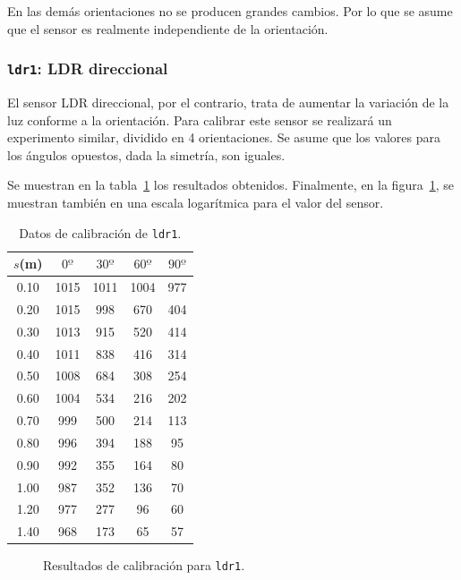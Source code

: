 \documentclass[10pt,a4paper,hidelinks,twocolumn,nobalancelastpage]{article}
\begin{document}
En las demás orientaciones no se producen grandes cambios. Por lo que se asume 
que el sensor es realmente independiente de la orientación.
\subsubsection{\texttt{ldr1}: LDR direccional}
El sensor LDR direccional, por el contrario, trata de aumentar la variación de 
la luz conforme a la orientación. Para calibrar este sensor se realizará un 
experimento similar, dividido en 4 orientaciones. Se asume que los valores para 
los ángulos opuestos, dada la simetría, son iguales.

Se muestran en la tabla~\ref{tab:ldr1} los resultados obtenidos. Finalmente, en 
la figura~\ref{fig:ldr1}, se muestran también en una escala logarítmica para el 
valor del sensor.

\vfill

\begin{table}[h]
\centering
\begin{tabular}{ | c | c | c | c | c | }
\hline
$s$(m) & $0º$ & $30º$ & $60º$ & $90º$ \\ \hline
0.10 & 1015 & 1011 & 1004 & 977 \\ \hline
0.20 & 1015 & 998 & 670 & 404 \\ \hline
0.30 & 1013 & 915 & 520 & 414 \\ \hline
0.40 & 1011 & 838 & 416 & 314 \\ \hline
0.50 & 1008 & 684 & 308 & 254 \\ \hline
0.60 & 1004 & 534 & 216 & 202 \\ \hline
0.70 & 999 & 500 & 214 & 113 \\ \hline
0.80 & 996 & 394 & 188 & 95 \\ \hline
0.90 & 992 & 355 & 164 & 80 \\ \hline
1.00 & 987 & 352 & 136 & 70 \\ \hline
1.20 & 977 & 277 & 96 & 60 \\ \hline
1.40 & 968 & 173 & 65 & 57 \\ \hline
\end{tabular}
\caption{Datos de calibración de \texttt{ldr1}.\label{tab:ldr1}}
\end{table}

\begin{figure}[H]
\centering
{}
\caption{Resultados de calibración para \texttt{ldr1}.\label{fig:ldr1}}
\end{figure}
\end{document}

